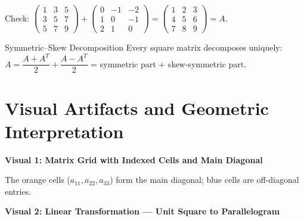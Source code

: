 \documentclass[12pt,a4paper]{article}
\begin{document}
Check: $\begin{pmatrix}1&3&5\\3&5&7\\5&7&9\end{pmatrix} + \begin{pmatrix}0&-1&-2\\1&0&-1\\2&1&0\end{pmatrix} = \begin{pmatrix}1&2&3\\4&5&6\\7&8&9\end{pmatrix} = A$. \checkmark

\begin{learnbox}{Symmetric--Skew Decomposition}
Every square matrix decomposes uniquely: $A = \dfrac{A+A^T}{2} + \dfrac{A-A^T}{2}$ = symmetric part + skew-symmetric part.
\end{learnbox}

\section{Visual Artifacts and Geometric Interpretation}

\textbf{Visual 1: Matrix Grid with Indexed Cells and Main Diagonal}

\begin{center}
\end{center}
The orange cells ($a_{11}, a_{22}, a_{33}$) form the main diagonal; blue cells are off-diagonal entries.

\medskip
\textbf{Visual 2: Linear Transformation --- Unit Square to Parallelogram}
\end{document}
